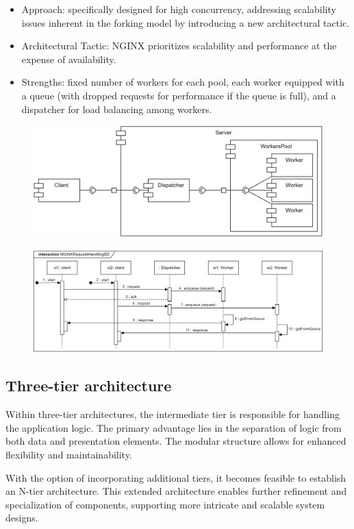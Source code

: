 \begin{itemize}
\begin{itemize}
            \item Approach: specifically designed for high concurrency, addressing scalability issues inherent in the forking model by introducing a new architectural tactic.
            \item Architectural Tactic: NGINX prioritizes scalability and performance at the expense of availability.
            \item Strengths: fixed number of workers for each pool, each worker equipped with a queue (with dropped requests for performance if the queue is full), and a dispatcher for load balancing among workers.
        \end{itemize}    
        \begin{figure}[H]
            \centering
            \includegraphics[width=0.5\linewidth]{images/work.png}
        \end{figure}
        \begin{figure}[H]
            \centering
            \includegraphics[width=0.9\linewidth]{images/work1.png}
        \end{figure}
\end{itemize}

\subsection*{Three-tier architecture}
Within three-tier architectures, the intermediate tier is responsible for handling the application logic. 
The primary advantage lies in the separation of logic from both data and presentation elements. 
The modular structure allows for enhanced flexibility and maintainability.

With the option of incorporating additional tiers, it becomes feasible to establish an N-tier architecture. 
This extended architecture enables further refinement and specialization of components, supporting more intricate and scalable system designs.

